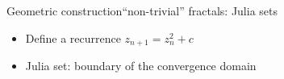 \documentclass[xcolor=x11names,compress,professionalfonts]{beamer}
\renewcommand{\(}{\begin{columns}}
\renewcommand{\)}{\end{columns}}
\newcommand{\<}[1]{\begin{column}{#1}}
\renewcommand{\>}{\end{column}}
\begin{document}
\begin{frame}{Geometric construction}{``non-trivial'' fractals: Julia sets}
\begin{itemize}
	\item Define a recurrence $z_{n+1} = z_n^2 + c$
	\item Julia set: boundary of the convergence domain
\end{itemize}

\centering
{}
    
\end{frame}
\end{document}
